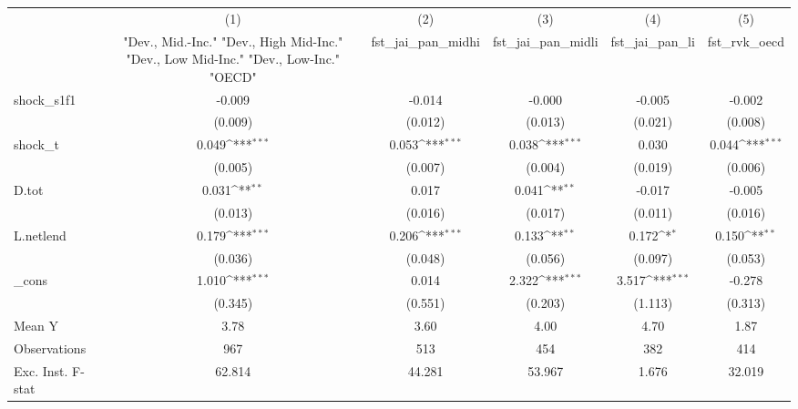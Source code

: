 {
\def\sym#1{\ifmmode^{#1}\else\(^{#1}\)\fi}
\begin{tabular}{l*{5}{c}}
\toprule
            &\multicolumn{1}{c}{(1)}&\multicolumn{1}{c}{(2)}&\multicolumn{1}{c}{(3)}&\multicolumn{1}{c}{(4)}&\multicolumn{1}{c}{(5)}\\
            &\multicolumn{1}{c}{ "Dev., Mid.-Inc." "Dev., High Mid-Inc." "Dev., Low Mid-Inc." "Dev., Low-Inc." "OECD" }&\multicolumn{1}{c}{fst\_jai\_pan\_midhi}&\multicolumn{1}{c}{fst\_jai\_pan\_midli}&\multicolumn{1}{c}{fst\_jai\_pan\_li}&\multicolumn{1}{c}{fst\_rvk\_oecd}\\
\midrule
shock\_s1f1  &      -0.009         &      -0.014         &      -0.000         &      -0.005         &      -0.002         \\
            &     (0.009)         &     (0.012)         &     (0.013)         &     (0.021)         &     (0.008)         \\
\addlinespace
shock\_t     &       0.049\sym{***}&       0.053\sym{***}&       0.038\sym{***}&       0.030         &       0.044\sym{***}\\
            &     (0.005)         &     (0.007)         &     (0.004)         &     (0.019)         &     (0.006)         \\
\addlinespace
D.tot       &       0.031\sym{**} &       0.017         &       0.041\sym{**} &      -0.017         &      -0.005         \\
            &     (0.013)         &     (0.016)         &     (0.017)         &     (0.011)         &     (0.016)         \\
\addlinespace
L.netlend   &       0.179\sym{***}&       0.206\sym{***}&       0.133\sym{**} &       0.172\sym{*}  &       0.150\sym{**} \\
            &     (0.036)         &     (0.048)         &     (0.056)         &     (0.097)         &     (0.053)         \\
\addlinespace
\_cons      &       1.010\sym{***}&       0.014         &       2.322\sym{***}&       3.517\sym{***}&      -0.278         \\
            &     (0.345)         &     (0.551)         &     (0.203)         &     (1.113)         &     (0.313)         \\
\midrule
Mean Y      &        3.78         &        3.60         &        4.00         &        4.70         &        1.87         \\
Observations&         967         &         513         &         454         &         382         &         414         \\
Exc. Inst. F-stat&      62.814         &      44.281         &      53.967         &       1.676         &      32.019         \\
\bottomrule
\end{tabular}
}
